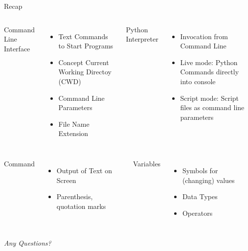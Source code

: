 
\begin{frame}[t,plain]
\titlepage
\end{frame}


\begin{frame}{Recap}
%
\vspace{6pt}
\begin{columns}
Command Line Interface
\begin{itemize}
\item Text Commands to Start Programs
\item Concept Current Working Directoy (CWD)
\item Command Line Parameters
\item File Name Extension
\end{itemize}
%
Python Interpreter
\begin{itemize}
\item Invocation from Command Line
\item Live mode: Python Commands directly into console
\item Script mode: Script files as command line parameters
\end{itemize}
\end{columns}

\vspace{12pt}
\begin{columns}[t]
Command 
\begin{itemize}
\item Output of Text on Screen
\item Parenthesis, quotation marks
\end{itemize}
%
Variables
\begin{itemize}
\item Symbols for (changing) values
\item Data Types
\item Operators
\end{itemize}
\end{columns}
%
\begin{center}
\emph{Any Questions?}
\end{center}
%
\end{frame}


